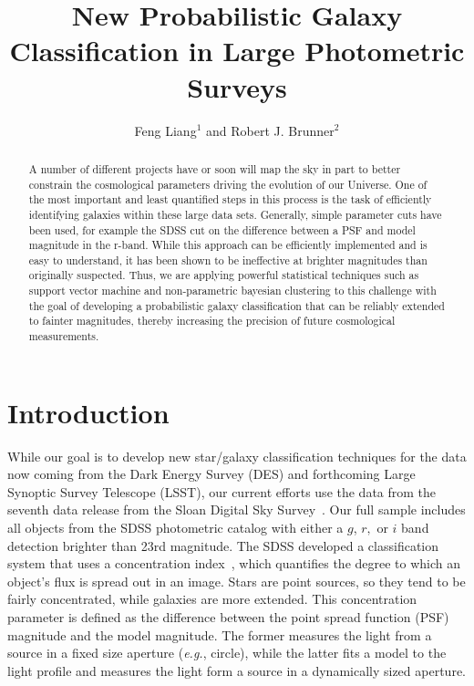 
\resetcounters




\title{New Probabilistic Galaxy Classification in Large Photometric Surveys}
\author{Feng Liang$^1$ and Robert J. Brunner$^2$
}


\begin{abstract}
A number of different projects have or soon will map the sky in part to better constrain the cosmological parameters driving the evolution of our Universe. One of the most important and least quantified steps in this process is the task of efficiently identifying galaxies within these large data sets. Generally, simple parameter cuts have been used, for example the SDSS cut on the difference between a PSF and model magnitude in the r-band. While this approach can be efficiently implemented and is easy to understand, it has been shown to be ineffective at brighter magnitudes than originally suspected. Thus, we are applying powerful statistical techniques such as support vector machine and non-parametric bayesian clustering to this challenge with the goal of developing a probabilistic galaxy classification that can be reliably extended to fainter magnitudes, thereby increasing the precision of future cosmological measurements.
\end{abstract}

\section{Introduction}

While our goal is to develop new star/galaxy classification techniques for the data now coming from the Dark Energy Survey (DES) and forthcoming Large Synoptic Survey Telescope (LSST), our current efforts use the data from the seventh data release from the Sloan Digital Sky Survey~\citep{york00}. Our full sample includes all objects from the SDSS photometric catalog with either a $g$, $r,$ or $i$ band detection brighter than 23rd magnitude. The SDSS developed a classification system that uses a concentration index~\citep{scranton02}, which quantifies the degree to which an object's flux is spread out in an image. Stars are point sources, so they tend to be fairly concentrated, while galaxies are more extended. This concentration parameter is defined as the difference between the point spread function (PSF) magnitude and the model magnitude. The former measures the light from a source in a fixed size aperture (\textit{e.g.}, circle), while the latter fits a model to the light profile and measures the light form a source in a dynamically sized aperture. 

